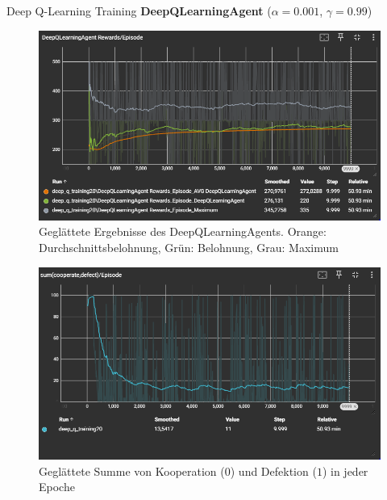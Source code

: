 \documentclass[final]{beamer}
\newlength{\colwidth}
\begin{document}
\begin{frame}[t]
\begin{columns}[t]
\begin{column}{\colwidth}
  \begin{alertblock}{Deep Q-Learning Training}
    \textbf{DeepQLearningAgent} ($\alpha = 0.001$, $\gamma = 0.99$)
    \begin{figure}[h]
      \centering
      \includegraphics[width=20cm]{logos/deepq.PNG}
      \caption{Geglättete Ergebnisse des DeepQLearningAgents. Orange: Durchschnittsbelohnung, Grün: Belohnung, Grau: Maximum}
    \end{figure}

    \begin{figure}[h]
      \centering
      \includegraphics[width=20cm]{logos/co_de.PNG}
      \caption{Geglättete Summe von Kooperation ($0$) und Defektion ($1$) in jeder Epoche}
    \end{figure}
    
  \end{alertblock}


\end{column}
\end{columns}
\end{frame}
\end{document}
